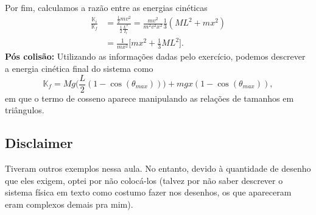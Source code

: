 \documentclass[physicsII_notes.tex]{subfiles}
\begin{document}
\begin{example}
	Por fim, calculamos a razão entre as energias cinéticas
	\begin{align*}
		\frac{\mathbb{K}_{i}}{\mathbb{K}_{f}} & = \frac{\frac{1}{2}mv^{2}}{\frac{1}{2}\frac{L^{2}}{I_{t}}} = \frac{mv^{2}}{m^{2}v^{2}x^{2}}\frac{1}{3}(ML^{2}+mx^{2}) \\
		                                      & = \frac{1}{mx^{2}}\biggl[mx^{2}+\frac{1}{3}ML^{2}\biggr].
	\end{align*}
	\textbf{Pós colisão:}
	Utilizando as informações dadas pelo exercício, podemos descrever a energia cinética final do sistema como
	\[
		\mathbb{K}_{f}=Mg \biggl(\frac{L}{2}(1-\cos{(\theta_{max} )})\biggr) + mgx(1-\cos{(\theta_{max} )}),
	\]
	em que o termo de cosseno aparece manipulando as relações de tamanhos em triângulos.
\end{example}
\subsection{Disclaimer}
Tiveram outros exemplos nessa aula. No entanto, devido à quantidade de desenho que eles exigem, optei por não colocá-los (talvez por não saber
descrever o sistema física em texto como costumo fazer nos desenhos, os que apareceram eram complexos demais pra mim).
\end{document}
